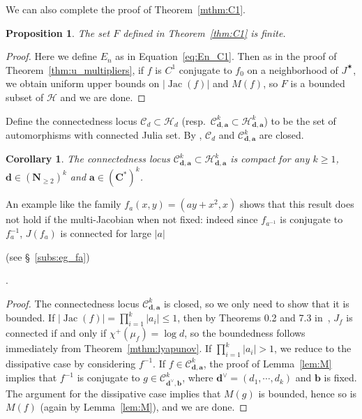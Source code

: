 \documentclass[oneside, 12pt]{amsart}
\newcommand{\abs}[1]{\left\vert#1\right\vert}
\newcommand{\inv}{^{-1}}
\newcommand{\jstar}{J^\varstar}
\DeclareMathOperator{\jac}{Jac}
\newcommand{\C}{\mathbf{C}}
\newcommand{\N}{\mathbf{N}}
\theoremstyle{plain}
\newtheorem{cor}[thm]{Corollary}
\newtheorem{pro}[thm]{Proposition}
\theoremstyle{definition}
\numberwithin{equation}{section}       %
\numberwithin{equation}{section}       %
\begin{document}
We can also complete the proof of Theorem~\ref{mthm:C1}. 

\begin{pro}\label{pro:C1_finite}
The set $F$ defined in Theorem~\ref{thm:C1} is finite. 
\end{pro}

\begin{proof}
Here we define $E_n$ as in Equation~\eqref{eq:En_C1}. Then as in the proof of Theorem~\ref{thm:u_multipliers}, 
if $f$ is $C^1$ conjugate to $f_0$ on a neighborhood of $\jstar$, 
we obtain uniform upper bounds on $\abs{\jac(f)}$ and  $M(f)$, 
so $F$ is a bounded subset of  $\mathcal H$ and we are done.  
\end{proof}

Define the connectedness locus ${\mathcal C}_d \subset \mathcal H_{d}$ (resp.\  ${\mathcal C}^k_{\mathbf d, \mathbf a} \subset \mathcal H^k_{\mathbf d, \mathbf a}$)  to be the set of automorphisms with connected Julia set. By \cite[Cor. 2.2]{connex}, ${\mathcal C}_d $ and ${\mathcal C}^k_{\mathbf d, \mathbf a}$ are closed. 

\begin{cor}\label{cor:connectedness}
The connectedness locus ${\mathcal C}^k_{\mathbf d, \mathbf a} \subset \mathcal H^k_{\mathbf d, \mathbf a}$ is compact
for any $k\geq 1$, $\mathbf d\in (\N_{\geq 2})^k$ and $\mathbf{a}\in (\C^*)^k$. 
\end{cor}

An example like the family $f_a(x,y) = (ay+x^2, x)$
shows that   this result  does not hold if the multi-Jacobian when not fixed: indeed 
since $f_{a\inv}$ is conjugate to $f_a\inv$, $J(f_a)$ is connected for large $\abs{a}$ 
\begin{vlongue}
(see \S~\ref{subs:eg_fa})
\end{vlongue}
. 




\begin{proof}
The connectedness locus ${\mathcal C}^k_{\mathbf d, \mathbf a}$  is closed,
so we only need to show that it is bounded. If  
$\abs{ {\jac(f)}} = \prod_{i=1}^k\abs{a_i}\leq 1$, then by Theorems 0.2 and 7.3 in~\cite{bs6}, 
$J_f$ is connected if and only if $\chi^+(\mu_f)   = \log d$, so the boundedness  follows immediately from Theorem~\ref{mthm:lyapunov}. 
If $\prod_{i=1}^k\abs{a_i}> 1$,  we  reduce to the dissipative case by considering  $f\inv$.  
If $f\in {\mathcal C}^k_{\mathbf d, \mathbf a}$, the proof of Lemma~\ref{lem:M} implies 
that $f\inv$ is conjugate to $g\in  {\mathcal C}^k_{\mathbf {d}^\vee, \mathbf b}$, where 
$\mathbf {d}^\vee = (d_1, \cdots , d_k)$ and $\mathbf b$ is fixed.  
The argument for  the dissipative case implies that $M(g)$ is bounded, hence so is $M(f)$ (again by Lemma~\ref{lem:M}), and we are done. 
\end{proof}
\end{document}
